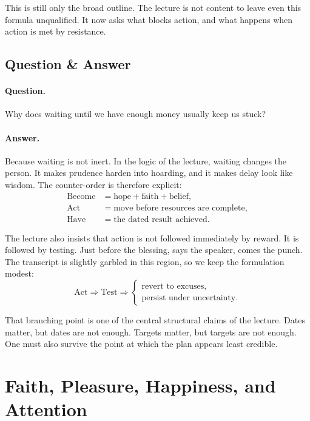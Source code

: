 This is still only the broad outline. The lecture is not content to leave even this formula unqualified. It now asks what blocks action, and what happens when action is met by resistance.

\subsection{Question \& Answer}

\paragraph{Question.} Why does waiting until we have enough money usually keep us stuck?

\paragraph{Answer.} Because waiting is not inert. In the logic of the lecture, waiting changes the person. It makes prudence harden into hoarding, and it makes delay look like wisdom. The counter-order is therefore explicit:
\begin{align}
\text{Become} &= \text{hope} + \text{faith} + \text{belief},\\
\text{Act} &= \text{move before resources are complete},\\
\text{Have} &= \text{the dated result achieved}.
\end{align}

The lecture also insists that action is not followed immediately by reward. It is followed by testing. Just before the blessing, says the speaker, comes the punch. The transcript is slightly garbled in this region, so we keep the formulation modest:
\begin{equation}
\text{Act} \Longrightarrow \text{Test} \Longrightarrow
\begin{cases}
\text{revert to excuses},\\
\text{persist under uncertainty}.
\end{cases}
\end{equation}

That branching point is one of the central structural claims of the lecture. Dates matter, but dates are not enough. Targets matter, but targets are not enough. One must also survive the point at which the plan appears least credible.

\section{Faith, Pleasure, Happiness, and Attention}

